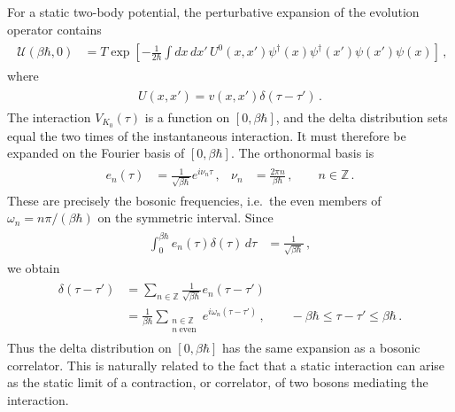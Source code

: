 \documentclass[../QFT_main.tex]{subfiles}
\begin{document}
\begin{mytheorem}
For a static two-body potential, the perturbative expansion of the evolution operator contains
{\small\begin{align}\begin{aligned}
    \mathcal U(\beta\hbar,0)
    &=
    T\exp\left[
        -\tfrac{1}{2\hbar}
        \int dx\,dx'\,
        U^0(x,x')
        \psi^\dagger(x)
        \psi^\dagger(x')
        \psi(x')
        \psi(x)
    \right]\,,
\end{aligned}\end{align}}
where
{\small\begin{align}\begin{aligned}
    U(x,x')=v(x,x')\delta(\tau-\tau')\,.
\end{aligned}\end{align}}
The interaction $V_{K_0}(\tau)$ is a function on $[0,\beta\hbar]$, and the delta distribution sets equal the two times of the instantaneous interaction.
It must therefore be expanded on the Fourier basis of $[0,\beta\hbar]$.
The orthonormal basis is
{\small\begin{align}\begin{aligned}
    e_n(\tau)
    &=
    \tfrac{1}{\sqrt{\beta\hbar}}e^{i\nu_n\tau}\,,
    &
    \nu_n&=\tfrac{2\pi n}{\beta\hbar}\,,
    \qquad n\in\mathbb Z\,.
\end{aligned}\end{align}}
These are precisely the bosonic frequencies, i.e.\ the even members of $\omega_n=n\pi/(\beta\hbar)$ on the symmetric interval.
Since
{\small\begin{align}\begin{aligned}
    \int_0^{\beta\hbar}e_n(\tau)\delta(\tau)\,d\tau
    &=
    \tfrac{1}{\sqrt{\beta\hbar}}\,,
\end{aligned}\end{align}}
we obtain
{\small\begin{align}\begin{aligned}
    \delta(\tau-\tau')
    &=
    \sum_{n\in\mathbb Z}
    \tfrac{1}{\sqrt{\beta\hbar}}e_n(\tau-\tau')
    \\
    &=
    \tfrac{1}{\beta\hbar}
    \sum_{\substack{n\in\mathbb Z\\ n\ \mathrm{even}}}
    e^{i\omega_n(\tau-\tau')}\,,
    \qquad
    -\beta\hbar\leq\tau-\tau'\leq\beta\hbar\,.
\end{aligned}\end{align}}
Thus the delta distribution on $[0,\beta\hbar]$ has the same expansion as a bosonic correlator.
This is naturally related to the fact that a static interaction can arise as the static limit of a contraction, or correlator, of two bosons mediating the interaction.


\end{mytheorem}
\end{document}

